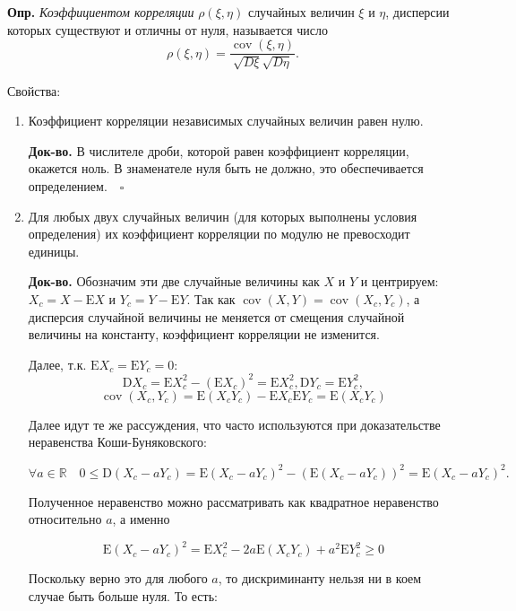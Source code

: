 \documentclass[oneside,final,14pt]{extreport}
\newcommand\mydef{{\bf Опр.}}
\newcommand\myqed{{\bf Док-во.}}
\theoremstyle{definition}
\begin{document}
\mydef{} {\it Коэффициентом корреляции} $\rho(\xi,\eta)$ случайных величин $\xi$ и $\eta$, дисперсии которых существуют и отличны от нуля, называется число
$$\rho(\xi, \eta)=\frac{\operatorname{cov}(\xi, \eta)}{\sqrt{D \xi} \sqrt{D \eta}}.$$

Свойства:

\begin{enumerate}
    \item Коэффициент корреляции независимых случайных величин равен нулю.
    
    \myqed{} В числителе дроби, которой равен коэффициент корреляции,
окажется ноль. В знаменателе нуля быть не должно, это обеспечивается определением.
$ ~~~ \square$

    \item Для любых двух случайных величин (для которых выполнены условия определения) их коэффициент корреляции по модулю не превосходит единицы.
    
    \myqed{} Обозначим эти две случайные величины как $X$ и $Y$ и центрируем: $X_c = X - \mathrm{E}X$ и $Y_c = Y - \mathrm{E}Y$. Так как $\operatorname{cov}(X, Y)=\operatorname{cov}\left(X_{c}, Y_{c}\right)$, а дисперсия случайной величины не меняется от смещения случайной величины на константу, коэффициент корреляции не изменится.
    
    Далее, т.к. $\mathrm{E} X_{c}=\mathrm{E} Y_{c}=0$:
    $$\mathrm{D} X_{c}=\mathrm{E} X_{c}^{2}-\left(\mathrm{E} X_{c}\right)^{2}=\mathrm{E} X_{c}^{2}, \mathrm{D} Y_{c}=\mathrm{E} Y_{c}^{2},$$$$ \operatorname{cov}\left(X_{c}, Y_{c}\right)=\mathrm{E}\left(X_{c} Y_{c}\right)-\mathrm{E} X_{c} \mathrm{E} Y_{c}=\mathrm{E}\left(X_{c} Y_{c}\right)$$
    
    Далее идут те же рассуждения, что часто используются при доказательстве неравенства Коши-Буняковского:
    
    $$\forall a \in \mathbb{R} \quad 0 \leqslant \mathrm{D}\left(X_{c}-a Y_{c}\right)=\mathrm{E}\left(X_{c}-a Y_{c}\right)^{2}-\left(\mathrm{E}\left(X_{c}-a Y_{c}\right)\right)^{2}=\mathrm{E}\left(X_{c}-a Y_{c}\right)^{2}.$$
    
    Полученное неравенство можно рассматривать как квадратное неравенство относительно $a$, а именно
    
    $$\mathrm{E}\left(X_{c}-a Y_{c}\right)^{2}=\mathrm{E} X_{c}^{2}-2 a \mathrm{E}\left(X_{c} Y_{c}\right)+a^{2} \mathrm{E} Y_{c}^{2} \geqslant 0$$
    
    Поскольку верно это для любого $a$, то дискриминанту нельзя ни в коем случае быть больше нуля. То есть:
    

\end{enumerate}
\end{document}

